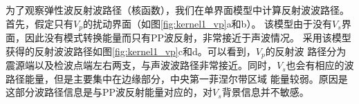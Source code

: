 为了观察弹性波反射波路径（核函数），我们在单界面模型中计算反射波波路径。首先，假定只有$V_p$的扰动界面（如图\ref{fig:kernel1_vp}a和b）。
该模型由于没有$V_s$界面，因此没有模式转换能量而只有PP波反射，非常接近于声波情况。
采用该模型获得的反射波波路径如图\ref{fig:kernel1_vp}c和d。可以看到，$V_p$的反射波
路径分为震源端以及检波点端左右两支，与声波波路径非常接近。同时，$V_s$也会有相应的波路径能量，但是主要集中在边缘部分，中央第一菲涅尔带区域
能量较弱。原因是这部分波路径信息是与PP波反射能量对应的，对$V_s$背景信息并不敏感。
